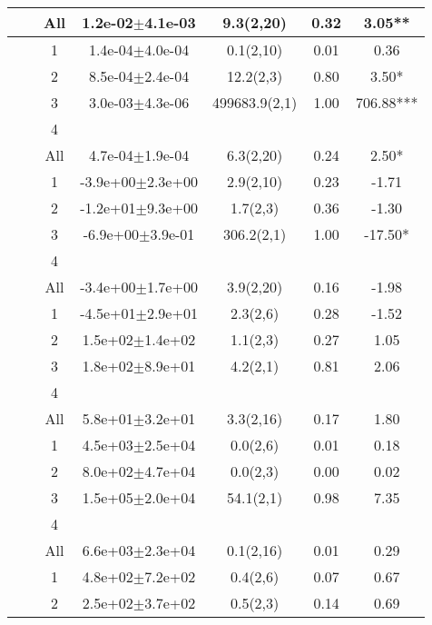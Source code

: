 \begin{longtable}{llccccS[table-format=-2.2, table-space-text-post = {***}]}
   &  & All &  1.2e-02$\pm$4.1e-03 & 9.3(2,20) & 0.32 & 3.05** \\ 
   \midrule
{} & {} & 1 &  1.4e-04$\pm$4.0e-04 & 0.1(2,10) & 0.01 & 0.36 \\ 
   &  & 2 &  8.5e-04$\pm$2.4e-04 & 12.2(2,3) & 0.80 & 3.50* \\ 
   &  & 3 &  3.0e-03$\pm$4.3e-06 & 499683.9(2,1) & 1.00 & 706.88*** \\ 
   &  & 4 &  &  &  &  \\ 
   &  & All &  4.7e-04$\pm$1.9e-04 & 6.3(2,20) & 0.24 & 2.50* \\ 
   \midrule
{} & {} & 1 & -3.9e+00$\pm$2.3e+00 & 2.9(2,10) & 0.23 & -1.71 \\ 
   &  & 2 & -1.2e+01$\pm$9.3e+00 & 1.7(2,3) & 0.36 & -1.30 \\ 
   &  & 3 & -6.9e+00$\pm$3.9e-01 & 306.2(2,1) & 1.00 & -17.50* \\ 
   &  & 4 &  &  &  &  \\ 
   &  & All & -3.4e+00$\pm$1.7e+00 & 3.9(2,20) & 0.16 & -1.98 \\ 
   \midrule
{} & {} & 1 & -4.5e+01$\pm$2.9e+01 & 2.3(2,6) & 0.28 & -1.52 \\ 
   &  & 2 &  1.5e+02$\pm$1.4e+02 & 1.1(2,3) & 0.27 & 1.05 \\ 
   &  & 3 &  1.8e+02$\pm$8.9e+01 & 4.2(2,1) & 0.81 & 2.06 \\ 
   &  & 4 &  &  &  &  \\ 
   &  & All &  5.8e+01$\pm$3.2e+01 & 3.3(2,16) & 0.17 & 1.80 \\ 
   \midrule
{} & {} & 1 &  4.5e+03$\pm$2.5e+04 & 0.0(2,6) & 0.01 & 0.18 \\ 
   &  & 2 &  8.0e+02$\pm$4.7e+04 & 0.0(2,3) & 0.00 & 0.02 \\ 
   &  & 3 &  1.5e+05$\pm$2.0e+04 & 54.1(2,1) & 0.98 & 7.35 \\ 
   &  & 4 &  &  &  &  \\ 
   &  & All &  6.6e+03$\pm$2.3e+04 & 0.1(2,16) & 0.01 & 0.29 \\ 
   \midrule
{} & {} & 1 &  4.8e+02$\pm$7.2e+02 & 0.4(2,6) & 0.07 & 0.67 \\ 
   &  & 2 &  2.5e+02$\pm$3.7e+02 & 0.5(2,3) & 0.14 & 0.69 \\ 

\end{longtable}
